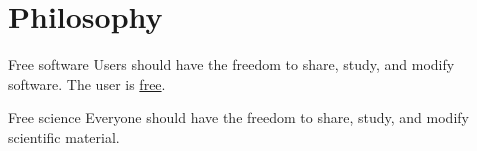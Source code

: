 \section{Philosophy}
\begin{frame}[c]{Free software}
  Users should have the freedom to \alert{share, study, and modify} software\footnotemark.
  \pause{}
  The \alert{user} is \href{https://www.fsf.org/about/what-is-free-software}{free}.

\end{frame}
\begin{frame}[c]{Free science}
  \alert{Everyone} should have the freedom to \alert{share, study, and modify} scientific material.
\end{frame}

